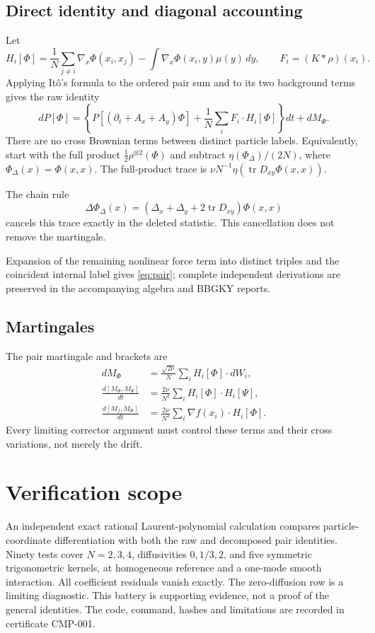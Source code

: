 \documentclass[11pt]{article}
\begin{document}
\subsection{Direct identity and diagonal accounting}
Let
\[
 H_i[\Phi]=\frac1N\sum_{j\ne i}\nabla_x\Phi(x_i,x_j)
                 -\int\nabla_x\Phi(x_i,y)\mu(y)\,dy,
 \qquad F_i=(K*\rho)(x_i).
\]
Applying It\^o's formula to the ordered pair sum and to its two
background terms gives the raw identity
\[
 dP[\Phi]=\left\{P[(\partial_t+A_x+A_y)\Phi]
             +\frac1N\sum_i F_i\cdot H_i[\Phi]\right\}dt+dM_\Phi.
\]
There are no cross Brownian terms between distinct particle labels.
Equivalently, start with the full product
$\frac12\rho^{\otimes2}(\Phi)$ and subtract
$\eta(\Phi_\Delta)/(2N)$, where $\Phi_\Delta(x)=\Phi(x,x)$.
The full-product trace is
$\nu N^{-1}\eta(\operatorname{tr}D_{xy}\Phi(x,x))$.
\par\begin{samepage}
The chain rule
\[
 \Delta\Phi_\Delta(x)=
 (\Delta_x+\Delta_y+2\operatorname{tr}D_{xy})\Phi(x,x)
\]
cancels this trace exactly in the deleted statistic. This cancellation
does not remove the martingale.
\end{samepage}
Expansion of the remaining nonlinear
force term into distinct triples and the coincident internal label
gives \eqref{eq:pair}; complete independent derivations are preserved
in the accompanying algebra and BBGKY reports.

\subsection{Martingales}
The pair martingale and brackets are
\begin{align*}
 dM_\Phi&=\frac{\sqrt{2\nu}}N\sum_i H_i[\Phi]\cdot dW_i,\\
 \frac{d[M_\Phi,M_\Psi]}{dt}&=\frac{2\nu}{N^2}\sum_iH_i[\Phi]\cdot H_i[\Psi],\\
 \frac{d[M_f,M_\Phi]}{dt}&=\frac{2\nu}{N^2}\sum_i\nabla f(x_i)\cdot H_i[\Phi].
\end{align*}
Every limiting corrector argument must control these terms and their
cross variations, not merely the drift.

\section{Verification scope}
An independent exact rational Laurent-polynomial calculation compares
particle-coordinate differentiation with both the raw and decomposed
pair identities. Ninety tests cover $N=2,3,4$, diffusivities
$0,1/3,2$, and five symmetric trigonometric kernels, at homogeneous
reference and a one-mode smooth interaction. All coefficient residuals
vanish exactly. The zero-diffusion row is a limiting diagnostic.
This battery is supporting evidence, not a proof of the general identities.
The code, command, hashes and limitations are recorded in certificate CMP-001.
\end{document}
